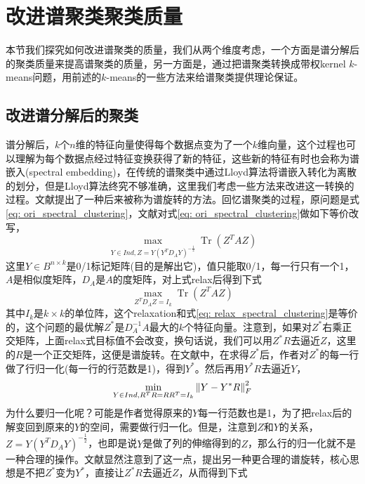 \section{改进谱聚类聚类质量}
本节我们探究如何改进谱聚类的质量，我们从两个维度考虑，一个方面是谱分解后的聚类质量来提高谱聚类的质量，另一方面是，通过把谱聚类转换成带权kernel $k$-means问题，用前述的$k$-means的一些方法来给谱聚类提供理论保证。

\subsection{改进谱分解后的聚类}
谱分解后，$k$个$n$维的特征向量使得每个数据点变为了一个$k$维向量，这个过程也可以理解为每个数据点经过特征变换获得了新的特征，这些新的特征有时也会称为谱嵌入(spectral embedding)，在传统的谱聚类中通过Lloyd算法将谱嵌入转化为离散的划分，但是Lloyd算法终究不够准确，这里我们考虑一些方法来改进这一转换的过程。文献\cite{stella2003multiclass}提出了一种后来被称为谱旋转的方法。回忆谱聚类的过程，原问题是式\ref{eq: ori_spectral_clustering}，文献\cite{stella2003multiclass}对式\ref{eq: ori_spectral_clustering}做如下等价改写，
\begin{equation}
	\max _{Y \in I n d, Z=Y\left(Y^{T} D_{A} Y\right)^{-\frac{1}{2}}} \operatorname{Tr}\left(Z^{T} A Z\right)
\end{equation}
这里$Y \in B^{n \times k}$是0/1标记矩阵(目的是解出它)，值只能取0/1，每一行只有一个1，$A$是相似度矩阵，$D_A$是$A$的度矩阵，对上式relax后得到下式
\begin{equation}
	\max _{Z^{T} D_{A} Z=I_{k}} \operatorname{Tr}\left(Z^{T} A Z\right)
\end{equation}
其中$I_k$是$k\times k$的单位阵，这个relaxation和式\ref{eq: relax_spectral_clustering}是等价的，这个问题的最优解$Z^*$是$D_A^{-1}A$最大的$k$个特征向量。注意到，如果对$Z^*$右乘正交矩阵，上面relax式目标值不会改变，换句话说，我们可以用$Z^*R$去逼近$Z$，这里的$R$是一个正交矩阵，这便是谱旋转。在文献\cite{stella2003multiclass}中，在求得$Z^*$后，作者对$Z^*$的每一行做了行归一化(每一行的行范数是1)，得到$Y^*$。然后再用$Y^*R$去逼近$Y$，
\begin{equation}
 	\min_{Y \in I n d,R^TR = RR^T = I_k} \left\lVert Y - Y^*R\right\rVert_F^2
\end{equation}
为什么要归一化呢？可能是作者觉得原来的$Y$每一行范数也是1，为了把relax后的解变回到原来的$Y$的空间，需要做行归一化。但是，注意到$Z$和$Y$的关系，$Z=Y\left(Y^{T} D_{A} Y\right)^{-\frac{1}{2}}$，也即是说$Y$是做了列的伸缩得到的$Z$，那么行的归一化就不是一种合理的操作。文献\cite{chen2017scalable}显然注意到了这一点，提出另一种更合理的谱旋转，核心思想是不把$Z^*$变为$Y^*$，直接让$Z^*R$去逼近$Z$，从而得到下式
